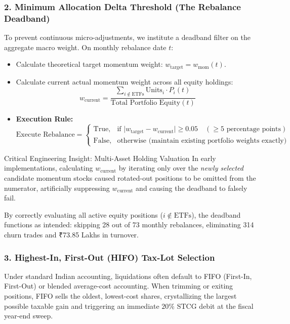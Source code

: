 \documentclass[11pt,a4paper]{article}
\begin{document}
\subsubsection{2. Minimum Allocation Delta Threshold (The Rebalance Deadband)}
To prevent continuous micro-adjustments, we institute a deadband filter on the aggregate macro weight. On monthly rebalance date $t$:
\begin{itemize}
    \item Calculate theoretical target momentum weight: $w_{\text{target}} = w_{\text{mom}}(t)$.
    \item Calculate current actual momentum weight across all equity holdings:
    \begin{equation}
    w_{\text{current}} = \frac{\sum_{i \notin \text{ETFs}} \text{Units}_i \cdot P_i(t)}{\text{Total Portfolio Equity}(t)}
    \end{equation}
    \item \textbf{Execution Rule:}
    \begin{equation}
    \text{Execute Rebalance} = 
    \begin{cases}
    \text{True}, & \text{if } \big| w_{\text{target}} - w_{\text{current}} \big| \ge 0.05 \quad (\ge 5 \text{ percentage points}) \\
    \text{False}, & \text{otherwise (maintain existing portfolio weights exactly)}
    \end{cases}
    \end{equation}
\end{itemize}
\begin{quantbox}{Critical Engineering Insight: Multi-Asset Holding Valuation}
In early implementations, calculating $w_{\text{current}}$ by iterating only over the \textit{newly selected} candidate momentum stocks caused rotated-out positions to be omitted from the numerator, artificially suppressing $w_{\text{current}}$ and causing the deadband to falsely fail. 

By correctly evaluating all active equity positions ($i \notin \text{ETFs}$), the deadband functions as intended: skipping 28 out of 73 monthly rebalances, eliminating 314 churn trades and ₹73.85 Lakhs in turnover.
\end{quantbox}

\subsubsection{3. Highest-In, First-Out (HIFO) Tax-Lot Selection}
Under standard Indian accounting, liquidations often default to FIFO (First-In, First-Out) or blended average-cost accounting. When trimming or exiting positions, FIFO sells the oldest, lowest-cost shares, crystallizing the largest possible taxable gain and triggering an immediate $20\%$ STCG debit at the fiscal year-end sweep.
\end{document}
